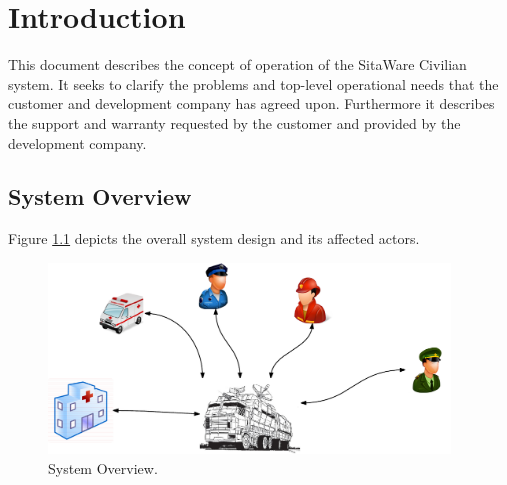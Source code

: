 \chapter{Introduction}
This document describes the concept of operation of the SitaWare Civilian system. It seeks to clarify the problems and top-level operational needs that the customer and development company has agreed upon. Furthermore it describes the support and warranty requested by the customer and provided by the development company. 

\section{System Overview}
Figure \ref{fig:system_overview} depicts the overall system design and its affected actors. 

\begin{figure}[H]
\centering
\includegraphics[width=0.95\textwidth]
{billeder/system_overview.pdf}
\caption{System Overview.}
\label{fig:system_overview}
\end{figure}